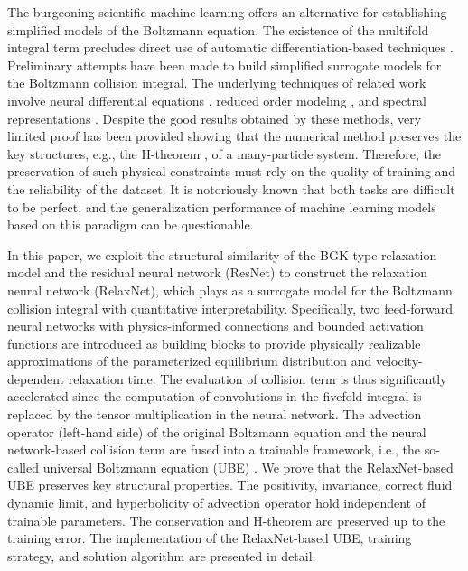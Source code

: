 \documentclass[preprint,3p,12pt,sort&compress]{elsarticle}
\begin{document}
The burgeoning scientific machine learning offers an alternative for establishing simplified models of the Boltzmann equation.
The existence of the multifold integral term precludes direct use of automatic differentiation-based techniques \cite{raissi2019physics,han2018solving}.
Preliminary attempts have been made to build simplified surrogate models for the Boltzmann collision integral.
The underlying techniques of related work involve neural differential equations \cite{xiao2021using}, reduced order modeling \cite{alekseenko2022fast}, and spectral representations \cite{miller2022neural}.
Despite the good results obtained by these methods, very limited proof has been provided showing that the numerical method preserves the key structures, e.g., the H-theorem \cite{chapman1970mathematical}, of a many-particle system.
Therefore, the preservation of such physical constraints must rely on the quality of training and the reliability of the dataset.
It is notoriously known that both tasks are difficult to be perfect, and the generalization performance of machine learning models based on this paradigm can be questionable.

In this paper, we exploit the structural similarity of the BGK-type relaxation model and the residual neural network (ResNet) to construct the relaxation neural network (RelaxNet), which plays as a surrogate model for the Boltzmann collision integral with quantitative interpretability.
Specifically, two feed-forward neural networks with physics-informed connections and bounded activation functions are introduced as building blocks to provide physically realizable approximations of the parameterized equilibrium distribution and velocity-dependent relaxation time.
The evaluation of collision term is thus significantly accelerated since the computation of convolutions in the fivefold integral is replaced by the tensor multiplication in the neural network.
The advection operator (left-hand side) of the original Boltzmann equation and the neural network-based collision term are fused into a trainable framework, i.e., the so-called universal Boltzmann equation (UBE) \cite{rackauckas2020universal,xiao2021using}.
We prove that the RelaxNet-based UBE preserves key structural properties.
The positivity, invariance, correct fluid dynamic limit, and hyperbolicity of advection operator hold independent of trainable parameters.
The conservation and H-theorem are preserved up to the training error.
The implementation of the RelaxNet-based UBE, training strategy, and solution algorithm are presented in detail.
\end{document}

